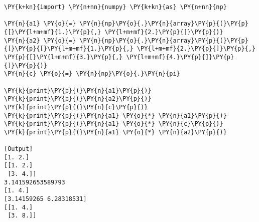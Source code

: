 \begin{Verbatim}[label=\makebox{\url{https://bitbucket.org/lbaldini/programming/src/tip/snippets/numpy\_arrays\_broadcasting.py}},commandchars=\\\{\}]
\PY{k+kn}{import} \PY{n+nn}{numpy} \PY{k+kn}{as} \PY{n+nn}{np}

\PY{n}{a1} \PY{o}{=} \PY{n}{np}\PY{o}{.}\PY{n}{array}\PY{p}{(}\PY{p}{[}\PY{l+m+mf}{1.}\PY{p}{,} \PY{l+m+mf}{2.}\PY{p}{]}\PY{p}{)}
\PY{n}{a2} \PY{o}{=} \PY{n}{np}\PY{o}{.}\PY{n}{array}\PY{p}{(}\PY{p}{[}\PY{p}{[}\PY{l+m+mf}{1.}\PY{p}{,} \PY{l+m+mf}{2.}\PY{p}{]}\PY{p}{,} \PY{p}{[}\PY{l+m+mf}{3.}\PY{p}{,} \PY{l+m+mf}{4.}\PY{p}{]}\PY{p}{]}\PY{p}{)}
\PY{n}{c} \PY{o}{=} \PY{n}{np}\PY{o}{.}\PY{n}{pi}

\PY{k}{print}\PY{p}{(}\PY{n}{a1}\PY{p}{)}
\PY{k}{print}\PY{p}{(}\PY{n}{a2}\PY{p}{)}
\PY{k}{print}\PY{p}{(}\PY{n}{c}\PY{p}{)}
\PY{k}{print}\PY{p}{(}\PY{n}{a1} \PY{o}{*} \PY{n}{a1}\PY{p}{)}
\PY{k}{print}\PY{p}{(}\PY{n}{a1} \PY{o}{*} \PY{n}{c}\PY{p}{)}
\PY{k}{print}\PY{p}{(}\PY{n}{a1} \PY{o}{*} \PY{n}{a2}\PY{p}{)}

[Output]
[1. 2.]
[[1. 2.]
 [3. 4.]]
3.141592653589793
[1. 4.]
[3.14159265 6.28318531]
[[1. 4.]
 [3. 8.]]
\end{Verbatim}